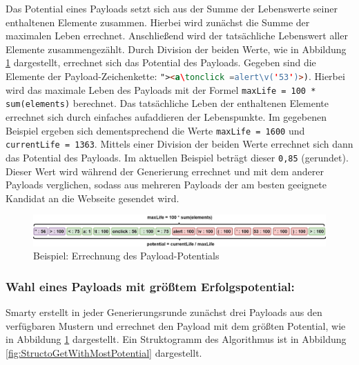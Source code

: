 Das Potential eines Payloads setzt sich aus der Summe der Lebenswerte seiner enthaltenen Elemente zusammen. Hierbei wird zunächst die Summe der maximalen Leben errechnet. Anschließend wird der tatsächliche Lebenswert aller Elemente zusammengezählt. Durch Division der beiden Werte, wie in Abbildung \ref{fig:payloadgrammarpotential} dargestellt, errechnet sich das Potential des Payloads. Gegeben sind die Elemente der Payload-Zeichenkette: \lstinline[language=html]!"><a\tonclick =alert\v('53')>)!. Hierbei wird das maximale Leben des Payloads mit der Formel \lstinline[language=html]!maxLife = 100 * sum(elements)! berechnet. Das tatsächliche Leben der enthaltenen Elemente errechnet sich durch einfaches aufaddieren der Lebenspunkte. Im gegebenen Beispiel ergeben sich dementsprechend die Werte \lstinline[language=html]!maxLife = 1600! und \lstinline[language=html]!currentLife = 1363!. Mittels einer Division der beiden Werte errechnet sich dann das Potential des Payloads. Im aktuellen Beispiel beträgt dieser \lstinline[language=html]!0,85! (gerundet). Dieser Wert wird während der Generierung errechnet und mit dem anderer Payloads verglichen, sodass aus mehreren Payloads der am besten geeignete Kandidat an die Webseite gesendet wird.

\begin{figure}[htbp] 
	\centering
	\includegraphics[width=\textwidth]{contents/images/PayloadGrammerPotential.jpg}
	\caption{Beispiel: Errechnung des Payload-Potentials}
	\label{fig:payloadgrammarpotential}
\end{figure}


\subsubsection{Wahl eines Payloads mit größtem Erfolgspotential:}

Smarty erstellt in jeder Generierungsrunde zunächst drei Payloads aus den verfügbaren Mustern und errechnet den Payload mit dem größten Potential, wie in Abbildung \ref{fig:payloadgrammarpotential} dargestellt. Ein Struktogramm des Algorithmus ist in Abbildung \ref{fig:StructoGetWithMostPotential} dargestellt.

